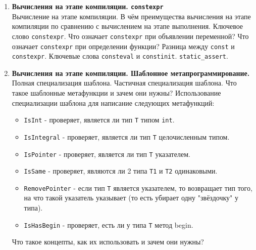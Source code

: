 \documentclass{article}
\begin{document}
\begin{enumerate}
\item \textbf{Вычисления на этапе компиляции. \texttt{constexpr}} \\
Вычисление на этапе компиляции. В чём преимущества вычисления на этапе компиляции по сравнению с вычислением на этапе выполнения.  Ключевое слово \texttt{constexpr}. Что означает \texttt{constexpr} при объявлении переменной? Что означает \texttt{constexpr} при определении функции? Разница между \texttt{const} и \texttt{constexpr}. Ключевые слова \texttt{consteval} и \texttt{constinit}. \texttt{static\_assert}.


\item \textbf{Вычисления на этапе компиляции. Шаблонное метапрограммирование.} \\
Полная специализация шаблона. Частичная специализация шаблона. Что такое шаблонные метафункции и зачем они нужны? Использование специализации шаблона для написание следующих метафункций:
\begin{itemize}
\item \texttt{IsInt} - проверяет, является ли тип \texttt{T} типом \texttt{int}.
\item \texttt{IsIntegral} - проверяет, является ли тип \texttt{T} целочисленным типом.
\item \texttt{IsPointer} - проверяет, является ли тип \texttt{T} указателем.
\item \texttt{IsSame} - проверяет, являются ли 2 типа \texttt{T1} и \texttt{T2} одинаковыми.
\item \texttt{RemovePointer} - если тип \texttt{T} является указателем, то возвращает тип того, на что такой указатель указывает (то есть убирает одну "звёздочку" у типа).
\item \texttt{IsHasBegin} - проверяет, есть ли у типа \texttt{T} метод begin.
\end{itemize}
Что такое концепты, как их использовать и зачем они нужны?



\end{enumerate}
\end{document}
